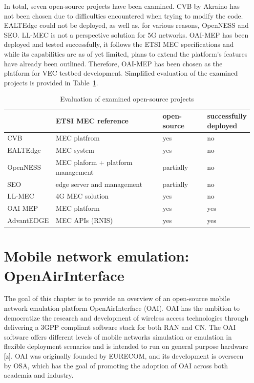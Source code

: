 \documentclass[12pt,a4paper,twoside]{report}
\begin{document}
In total, seven open-source projects have been examined. CVB by Akraino has not been chosen due to difficulties encountered when trying to modify the code. EALTEdge could not be deployed, as well as, for various reasons, OpenNESS and SEO. LL-MEC is not a perspective solution for 5G networks. OAI-MEP has been deployed and tested successfully, it follows the ETSI MEC specifications and while its capabilities are as of yet limited, plans to extend the platform’s features have already been outlined. Therefore, OAI-MEP has been chosen as the platform for VEC testbed development. Simplified evaluation of the examined projects is provided in Table~\ref{T:os-mec-proj}.
\begin{table}[!ht]
    \centering
	\caption{Evaluation of examined open-source projects}
	\label{T:os-mec-proj}
    \begin{tabular}{|l|l|l|l|}
    \hline
        & ETSI MEC reference & open-source & \Longunderstack{successfully\\deployed} \\ \hline
        CVB & MEC platfrom & yes & no \\ \hline
        EALTEdge & MEC system & yes & no \\ \hline
        OpenNESS & MEC plaform + platform management & partially & no \\ \hline
        SEO & edge server and management & partially & no \\ \hline
        LL-MEC & 4G MEC solution & yes & no \\ \hline
        OAI MEP & MEC platform & yes & yes \\ \hline
        AdvantEDGE & MEC APIs (RNIS) & yes & yes \\ \hline
    \end{tabular}
\end{table}
\chapter{Mobile network emulation: \texorpdfstring{\\ \mbox{OpenAirInterface}}{OpenAirInterface}}
\label{Ch:OAI}
The goal of this chapter is to provide an overview of an open-source mobile network emulation platform OpenAirInterface (OAI). OAI has the ambition to democratize the research and development of wireless access technologies through delivering a 3GPP compliant software stack for both RAN and CN. The OAI software offers different levels of mobile networks simulation or emulation in flexible deployment scenarios and is intended to run on general purpose hardware [z]. OAI was originally founded by EURECOM, and its development is overseen by OSA, which has the goal of promoting the adoption of OAI across both academia and industry. 
\end{document}
